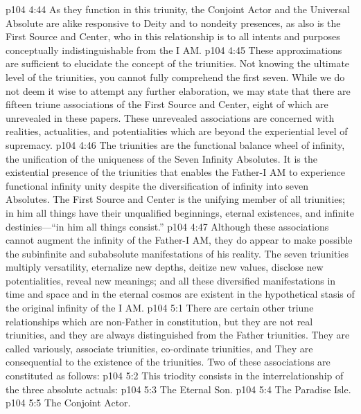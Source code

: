 \vs p104 4:44 As they function in this triunity, the Conjoint Actor and the Universal Absolute are alike responsive to Deity and to nondeity presences, as also is the First Source and Center, who in this relationship is to all intents and purposes conceptually indistinguishable from the I AM.
\pc \vs p104 4:45 These approximations are sufficient to elucidate the concept of the triunities. Not knowing the ultimate level of the triunities, you cannot fully comprehend the first seven. While we do not deem it wise to attempt any further elaboration, we may state that there are fifteen triune associations of the First Source and Center, eight of which are unrevealed in these papers. These unrevealed associations are concerned with realities, actualities, and potentialities which are beyond the experiential level of supremacy.
\vs p104 4:46 The triunities are the functional balance wheel of infinity, the unification of the uniqueness of the Seven Infinity Absolutes. It is the existential presence of the triunities that enables the Father\hyp{}I AM to experience functional infinity unity despite the diversification of infinity into seven Absolutes. The First Source and Center is the unifying member of all triunities; in him all things have their unqualified beginnings, eternal existences, and infinite destinies---“in him all things consist.”
\vs p104 4:47 Although these associations cannot augment the infinity of the Father\hyp{}I AM, they do appear to make possible the subinfinite and subabsolute manifestations of his reality. The seven triunities multiply versatility, eternalize new depths, deitize new values, disclose new potentialities, reveal new meanings; and all these diversified manifestations in time and space and in the eternal cosmos are existent in the hypothetical stasis of the original infinity of the I AM.
\vs p104 5:1 There are certain other triune relationships which are non\hyp{}Father in constitution, but they are not real triunities, and they are always distinguished from the Father triunities. They are called variously, associate triunities, co\hyp{}ordinate triunities, and  They are consequential to the existence of the triunities. Two of these associations are constituted as follows:
\vs p104 5:2  This triodity consists in the interrelationship of the three absolute actuals:
\pc \vs p104 5:3 \bibnobreakspace The Eternal Son.
\vs p104 5:4 \bibnobreakspace The Paradise Isle.
\vs p104 5:5 \bibnobreakspace The Conjoint Actor.
